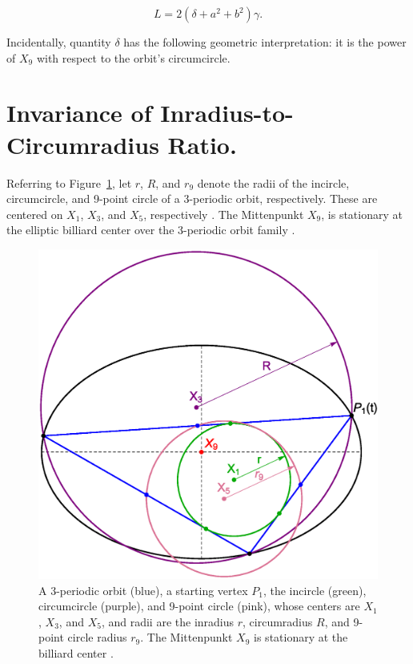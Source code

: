 \documentclass{amsart}
\theoremstyle{definition}
\begin{document}
\begin{equation}
L=2(\delta+a^2+b^2)\gamma.
\label{eqn:perimeter}
\end{equation}

\noindent Incidentally, quantity $\delta$ has the following geometric interpretation: it is the power of $X_9$ with respect to the orbit's circumcircle.


\section{Invariance of Inradius-to-Circumradius Ratio.}
\label{sec:rovr}
Referring to  Figure~\ref{fig:radii}, let $r$, $R$, and $r_9$ denote the radii of the incircle, circumcircle, and 9-point circle of a 3-periodic orbit, respectively. These are centered on $X_1$, $X_3$, and $X_5$, respectively \cite{coxeter67}. The Mittenpunkt $X_9$, is stationary at the elliptic billiard center over the 3-periodic orbit family \cite{reznik2019-intelligencer}.

\begin{figure}[H]
    \centering
    \includegraphics[width=.75\textwidth]{1040_Radii.eps}
    \caption{A 3-periodic orbit (blue), a starting vertex $P_1$, the incircle (green), circumcircle (purple), and 9-point circle (pink), whose centers are $X_1$, $X_3$, and $X_5$, and radii are the inradius $r$, circumradius $R$, and 9-point circle radius $r_9$. The Mittenpunkt $X_9$ is stationary at the billiard center \cite{reznik2019-intelligencer}.}
    \label{fig:radii}
\end{figure}
\end{document}
